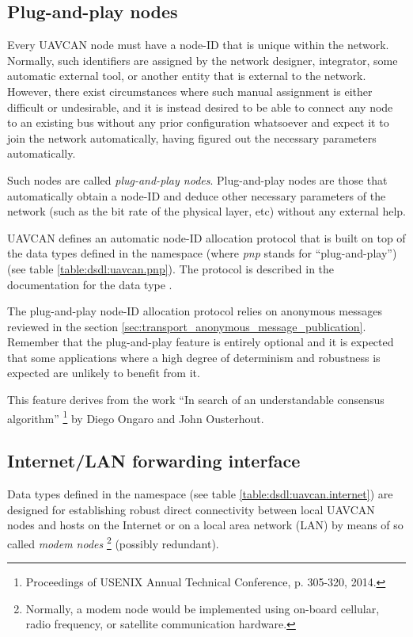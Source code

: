 \subsection{Plug-and-play nodes}

Every UAVCAN node must have a node-ID that is unique within the network.
Normally, such identifiers are assigned by the network designer, integrator, some automatic external tool,
or another entity that is external to the network.
However, there exist circumstances where such manual assignment is either difficult or undesirable,
and it is instead desired to be able to connect any node to an existing bus without any prior configuration
whatsoever and expect it to join the network automatically, having figured out the necessary parameters automatically.

Such nodes are called \emph{plug-and-play nodes}. Plug-and-play nodes are those that automatically obtain a node-ID
and deduce other necessary parameters of the network (such as the bit rate of the physical layer, etc) without any
external help.

UAVCAN defines an automatic node-ID allocation protocol that is built on top of the data types defined in the
namespace  (where \emph{pnp} stands for ``plug-and-play'')
(see table \ref{table:dsdl:uavcan.pnp}).
The protocol is described in the documentation for the data type .

The plug-and-play node-ID allocation protocol relies on anonymous messages reviewed in the section
\ref{sec:transport_anonymous_message_publication}.
Remember that the plug-and-play feature is entirely optional and it is expected that some applications where a
high degree of determinism and robustness is expected are unlikely to benefit from it.

This feature derives from the work
``In search of an understandable consensus algorithm''%
\footnote{Proceedings of USENIX Annual Technical Conference, p. 305-320, 2014.}
by Diego Ongaro and John Ousterhout.


\subsection{Internet/LAN forwarding interface}

Data types defined in the namespace  (see table \ref{table:dsdl:uavcan.internet})
are designed for establishing robust direct connectivity between local UAVCAN nodes and hosts on the Internet
or on a local area network (LAN) by means of so called \emph{modem nodes}%
\footnote{Normally, a modem node would be implemented using on-board cellular, radio frequency,
or satellite communication hardware.}
(possibly redundant).

